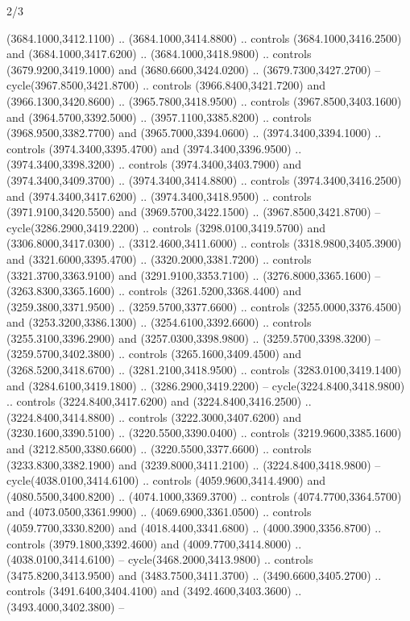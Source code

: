 \begin{flagdescription}{2/3}
\begin{scope}[shift={(0.5\flaglength,0.5)},scale=\flagwidth/130]
\begin{scope}[y=0.01mm, x=0.01mm,shift={(-3365,-2250)}]
  (3684.1000,3412.1100) .. (3684.1000,3414.8800) .. controls
  (3684.1000,3416.2500) and (3684.1000,3417.6200) .. (3684.1000,3418.9800) ..
  controls (3679.9200,3419.1000) and (3680.6600,3424.0200) ..
  (3679.7300,3427.2700) -- cycle(3967.8500,3421.8700) .. controls
  (3966.8400,3421.7200) and (3966.1300,3420.8600) .. (3965.7800,3418.9500) ..
  controls (3967.8500,3403.1600) and (3964.5700,3392.5000) ..
  (3957.1100,3385.8200) .. controls (3968.9500,3382.7700) and
  (3965.7000,3394.0600) .. (3974.3400,3394.1000) .. controls
  (3974.3400,3395.4700) and (3974.3400,3396.9500) .. (3974.3400,3398.3200) ..
  controls (3974.3400,3403.7900) and (3974.3400,3409.3700) ..
  (3974.3400,3414.8800) .. controls (3974.3400,3416.2500) and
  (3974.3400,3417.6200) .. (3974.3400,3418.9500) .. controls
  (3971.9100,3420.5500) and (3969.5700,3422.1500) .. (3967.8500,3421.8700) --
  cycle(3286.2900,3419.2200) .. controls (3298.0100,3419.5700) and
  (3306.8000,3417.0300) .. (3312.4600,3411.6000) .. controls
  (3318.9800,3405.3900) and (3321.6000,3395.4700) .. (3320.2000,3381.7200) ..
  controls (3321.3700,3363.9100) and (3291.9100,3353.7100) ..
  (3276.8000,3365.1600) -- (3263.8300,3365.1600) .. controls
  (3261.5200,3368.4400) and (3259.3800,3371.9500) .. (3259.5700,3377.6600) ..
  controls (3255.0000,3376.4500) and (3253.3200,3386.1300) ..
  (3254.6100,3392.6600) .. controls (3255.3100,3396.2900) and
  (3257.0300,3398.9800) .. (3259.5700,3398.3200) -- (3259.5700,3402.3800) ..
  controls (3265.1600,3409.4500) and (3268.5200,3418.6700) ..
  (3281.2100,3418.9500) .. controls (3283.0100,3419.1400) and
  (3284.6100,3419.1800) .. (3286.2900,3419.2200) -- cycle(3224.8400,3418.9800)
  .. controls (3224.8400,3417.6200) and (3224.8400,3416.2500) ..
  (3224.8400,3414.8800) .. controls (3222.3000,3407.6200) and
  (3230.1600,3390.5100) .. (3220.5500,3390.0400) .. controls
  (3219.9600,3385.1600) and (3212.8500,3380.6600) .. (3220.5500,3377.6600) ..
  controls (3233.8300,3382.1900) and (3239.8000,3411.2100) ..
  (3224.8400,3418.9800) -- cycle(4038.0100,3414.6100) .. controls
  (4059.9600,3414.4900) and (4080.5500,3400.8200) .. (4074.1000,3369.3700) ..
  controls (4074.7700,3364.5700) and (4073.0500,3361.9900) ..
  (4069.6900,3361.0500) .. controls (4059.7700,3330.8200) and
  (4018.4400,3341.6800) .. (4000.3900,3356.8700) .. controls
  (3979.1800,3392.4600) and (4009.7700,3414.8000) .. (4038.0100,3414.6100) --
  cycle(3468.2000,3413.9800) .. controls (3475.8200,3413.9500) and
  (3483.7500,3411.3700) .. (3490.6600,3405.2700) .. controls
  (3491.6400,3404.4100) and (3492.4600,3403.3600) .. (3493.4000,3402.3800) --

\end{scope}
\end{scope}
\end{flagdescription}
